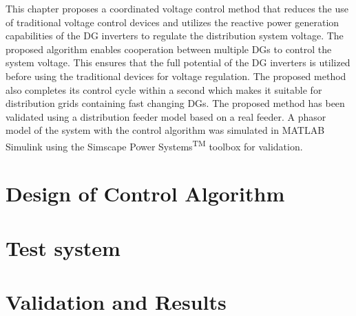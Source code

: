 This chapter proposes a coordinated voltage control method that reduces the use of traditional voltage control devices and utilizes the reactive power generation capabilities of the DG inverters to regulate the distribution system voltage. The proposed algorithm enables cooperation between multiple DGs to control the system voltage. This ensures that the full potential of the DG inverters is utilized before using the traditional devices for voltage regulation. The proposed method also completes its control cycle within a second which makes it suitable for distribution grids containing fast changing DGs. The proposed method has been validated using a distribution feeder model based on a real feeder. A phasor model of the system with the control algorithm was simulated in MATLAB\textsuperscript{\textregistered} Simulink\textsuperscript{\textregistered} using the Simscape Power Systems\textsuperscript{TM} toolbox for validation.


\section{Design of Control Algorithm}\label{sec:design}


\section{Test system}


\section{Validation and Results}\label{sec:val}

